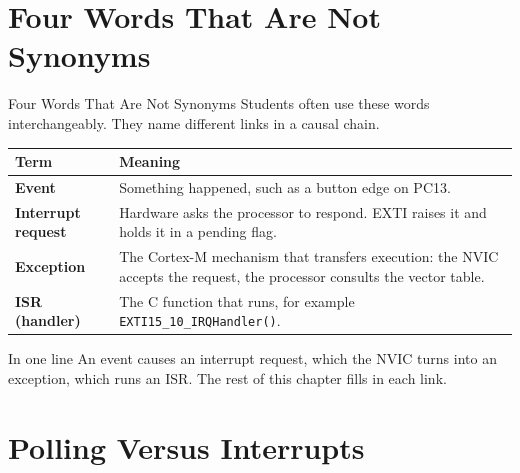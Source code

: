 \documentclass[9pt,aspectratio=169,xcolor=table]{beamer}
\begin{document}
\section{Four Words That Are Not Synonyms}

\begin{frame}{Four Words That Are Not Synonyms}
    \leavevmode
    {\small Students often use these words interchangeably. They name
    different links in a causal chain.}

    \vspace{2mm}
    \begin{center}
    {\small
    \striped
    \begin{tabular}{@{}l R{.68\textwidth}@{}}
        \toprule
        \textbf{Term} & \textbf{Meaning} \\
        \midrule
        \textbf{Event}             & Something happened, such as a button edge on PC13. \\
        \textbf{Interrupt request} & Hardware asks the processor to respond. EXTI raises it and holds it in a pending flag. \\
        \textbf{Exception}         & The Cortex-M mechanism that transfers execution: the NVIC accepts the request, the processor consults the vector table. \\
        \textbf{ISR (handler)}     & The C function that runs, for example \texttt{EXTI15\_10\_IRQHandler()}. \\
        \bottomrule
    \end{tabular}}
    \end{center}

    \vspace{3mm}
    \begin{block}{In one line}
        An \alert{event} causes an \alert{interrupt request}, which the
        NVIC turns into an \alert{exception}, which runs an \alert{ISR}.
        The rest of this chapter fills in each link.
    \end{block}
\end{frame}


\section{Polling Versus Interrupts}
\end{document}
